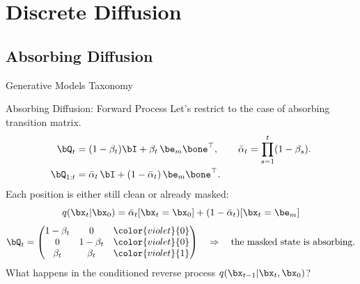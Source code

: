 \documentclass{beamer}
\begin{document}
\section{Discrete Diffusion}
\subsection{Absorbing Diffusion}
\begin{frame}{Generative Models Taxonomy}
\end{frame}
\begin{frame}{Absorbing Diffusion: Forward Process}
	Let's restrict to the case of absorbing transition matrix.
	\vspace{-0.3cm}
	\begin{align*}
		\bQ_t &= (1-\beta_t)\bI + \beta_t\, \be_m \bone^\top,
		\qquad
		\bar\alpha_t = \prod_{s=1}^t (1-\beta_s). \\
		\bQ_{1:t} &= \bar\alpha_t\,\bI + (1-\bar\alpha_t)\,\be_m \bone^\top.
	\end{align*}
	\eqpause
	Each position is either still clean or already masked:
	\[
		q(\bx_t | \bx_0) = \bar\alpha_t [\bx_t = \bx_0] + (1 - \bar\alpha_t) [\bx_t = \be_m]
	\]
	\eqpause
	\[
		\bQ_t =
		\begin{pmatrix}
			1-\beta_t & 0           & \color{violet}{0} \\
			0           & 1-\beta_t & \color{violet}{0} \\
			\beta_t     & \beta_t     & \color{violet}{1}
		\end{pmatrix} 
		\quad \Rightarrow \quad 
		\text{the masked state is absorbing.}
	\]
	\eqpause
	What happens in the conditioned reverse process
	$q(\bx_{t-1} | \bx_t, \bx_0)$?
\end{frame}
\end{document}
